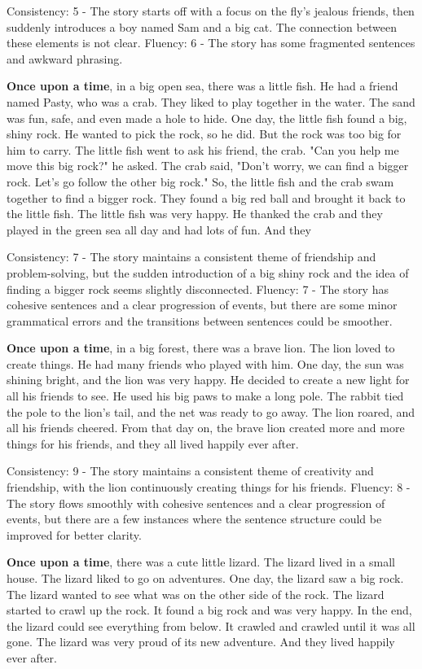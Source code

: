 \documentclass{article}
\begin{document}
Consistency: 5 - The story starts off with a focus on the fly's jealous friends, then suddenly introduces a boy named Sam and a big cat. The connection between these elements is not clear.
Fluency: 6 - The story has some fragmented sentences and awkward phrasing.

\textbf{Once upon a time}, in a big open sea, there was a little fish. He had a friend named Pasty, who was a crab. They liked to play together in the water. The sand was fun, safe, and even made a hole to hide. One day, the little fish found a big, shiny rock. He wanted to pick the rock, so he did. But the rock was too big for him to carry. The little fish went to ask his friend, the crab. "Can you help me move this big rock?" he asked. The crab said, "Don't worry, we can find a bigger rock. Let's go follow the other big rock." So, the little fish and the crab swam together to find a bigger rock. They found a big red ball and brought it back to the little fish. The little fish was very happy. He thanked the crab and they played in the green sea all day and had lots of fun. And they

Consistency: 7 - The story maintains a consistent theme of friendship and problem-solving, but the sudden introduction of a big shiny rock and the idea of finding a bigger rock seems slightly disconnected.
Fluency: 7 - The story has cohesive sentences and a clear progression of events, but there are some minor grammatical errors and the transitions between sentences could be smoother.

\textbf{Once upon a time}, in a big forest, there was a brave lion. The lion loved to create things. He had many friends who played with him. One day, the sun was shining bright, and the lion was very happy. He decided to create a new light for all his friends to see. He used his big paws to make a long pole. The rabbit tied the pole to the lion's tail, and the net was ready to go away. The lion roared, and all his friends cheered. From that day on, the brave lion created more and more things for his friends, and they all lived happily ever after.

Consistency: 9 - The story maintains a consistent theme of creativity and friendship, with the lion continuously creating things for his friends.
Fluency: 8 - The story flows smoothly with cohesive sentences and a clear progression of events, but there are a few instances where the sentence structure could be improved for better clarity.

\textbf{Once upon a time}, there was a cute little lizard. The lizard lived in a small house. The lizard liked to go on adventures. One day, the lizard saw a big rock. The lizard wanted to see what was on the other side of the rock. The lizard started to crawl up the rock. It found a big rock and was very happy. In the end, the lizard could see everything from below. It crawled and crawled until it was all gone. The lizard was very proud of its new adventure. And they lived happily ever after.
\end{document}
